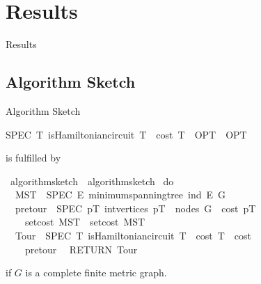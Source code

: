 \documentclass[%
	sans,
	12pt,
]{beamer}
\newcommand{\high}[1]{{\usebeamercolor[fg]{structure} #1}}
\def\isacartoucheopen{}%
\def\isacartoucheclose{}%
\begin{document}
\section{Results}
\begin{frame}
\begin{center}
	\huge\high{Results}
\end{center}
\end{frame}

\subsection{Algorithm Sketch}
\begin{frame}{Algorithm Sketch}%
\begin{isabelle}
	SPEC\ {\isacharparenleft}{\isasymlambda}T{\isachardot}\ is{\isacharunderscore}Hamiltonian{\isacharunderscore}circuit\ T\ {\isasymand}\ cost\ T\ {\isasymle}\ OPT\ {\isacharplus}\ OPT{\isacharparenright}{\isacartoucheclose}%
\end{isabelle}
is fulfilled by %
\begin{isabelle}
	\isamarkupfalse%
	\ algorithm{\isacharunderscore}sketch\ \ {\isacartoucheopen}algorithm{\isacharunderscore}sketch\ {\isacharequal}\isanewline
	do\ {\isacharbraceleft}\isanewline
	\ \ MST\ {\isasymleftarrow}\ SPEC\ {\isacharparenleft}{\isasymlambda}E{\isacharprime}{\isachardot}\ minimum{\isacharunderscore}spanning{\isacharunderscore}tree\ {\isacharparenleft}ind\ E{\isacharprime}{\isacharparenright}\ G{\isacharparenright}{\isacharsemicolon}\isanewline
	\ \ pretour\ {\isasymleftarrow}\ SPEC\ {\isacharparenleft}{\isasymlambda}pT{\isachardot}\ int{\isacharunderscore}vertices\ pT\ {\isacharequal}\ nodes\ G\ {\isasymand}\ cost\ pT\ {\isasymle}\\ \ \ \ \ set{\isacharunderscore}cost\ MST\ {\isacharplus}\ set{\isacharunderscore}cost\ MST{\isacharparenright}{\isacharsemicolon}\isanewline
	\ \ Tour\ {\isasymleftarrow}\ SPEC\ {\isacharparenleft}{\isasymlambda}T{\isachardot}\ is{\isacharunderscore}Hamiltonian{\isacharunderscore}circuit\ T\ {\isasymand}\ cost\ T\ {\isasymle}\ cost\\ \ \ \ \ pretour{\isacharparenright}{\isacharsemicolon}\isanewline
	\ \ RETURN\ Tour\isanewline
	{\isacharbraceright}{\isacartoucheclose}
\end{isabelle}
if $G$ is a complete finite metric graph.
\end{frame}
\end{document}

